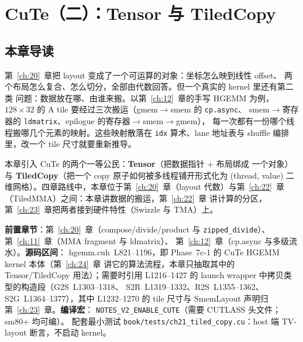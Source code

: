 \makeatletter
\providecommand{\urlchbrk}[1]{\@tfor\next:=#1\do{\next\allowbreak}}
\makeatother
\providecommand{\url}[1]{{\ttfamily\urlchbrk{#1}}}
\chapter{CuTe（二）：Tensor 与 TiledCopy}\label{ch:21}

\section{本章导读}

第~\ref{ch:20}~章把 layout 变成了一个可运算的对象：坐标怎么映到线性 offset、
两个布局怎么复合、怎么切分，全部由代数回答。但一个真实的 kernel 里还有第二类
问题：数据放在哪、由谁来搬。以第~\ref{ch:12}~章的手写 HGEMM 为例，
$128\times32$ 的 A tile 要经过三次搬运（gmem$\to$smem 的 \texttt{cp.async}、
smem$\to$寄存器的 \texttt{ldmatrix}、epilogue 的寄存器$\to$smem$\to$gmem），
每一次都有一份哪个线程搬哪几个元素的映射。这些映射散落在
\texttt{idx} 算术、lane 地址表与 shuffle 编排里，改一个 tile 尺寸就要重新推导。

本章引入 CuTe 的两个一等公民：\textbf{Tensor}（把数据指针 $+$ 布局绑成
一个对象）与 \textbf{TiledCopy}（把一个 copy 原子如何被多线程铺开形式化为
(thread, value) 二维网格）。四章路线中，本章位于第~\ref{ch:20}~章（layout
代数）与第~\ref{ch:22}~章（TiledMMA）之间：本章讲数据的搬运，第~\ref{ch:22}~章
讲计算的分区，第~\ref{ch:23}~章把两者接到硬件特性（Swizzle 与 TMA）上。

\textbf{前置章节}：第~\ref{ch:20}~章（compose/divide/product 与
\texttt{zipped\_\allowbreak{}divide}）、第~\ref{ch:11}~章（MMA fragment 与 ldmatrix）、
第~\ref{ch:12}~章（cp.async 与多级流水）。\textbf{源码区间}：
hgemm.cuh~L821--1196，即 Phase~7c-1 的 CuTe HGEMM kernel 本体（第~\ref{ch:24}~章
讲它的算法流程，本章只抽取其中的 Tensor/TiledCopy 用法）；需要时引用
L1216--1427 的 launch wrapper 中拷贝类型的构造段（G2S~L1303--1318、
S2R~L1319--1332、R2S~L1355--1362、S2G~L1364--1377），其中 L1232--1270 的
tile 尺寸与 SmemLayout 声明归第~\ref{ch:23}~章。\textbf{编译宏}：
\texttt{NOTES\_\allowbreak{}V2\_\allowbreak{}ENABLE\_\allowbreak{}CUTE}（需要 CUTLASS 头文件；sm80+ 均可编）。
配套最小测试 \texttt{book/\allowbreak{}tests/\allowbreak{}ch21\_\allowbreak{}tiled\_\allowbreak{}copy.cu}：host 端 TV-layout
断言，不启动 kernel。

